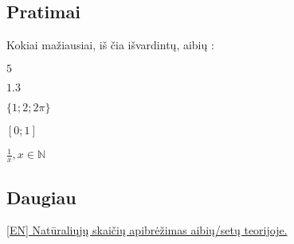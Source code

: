 \subsection{Pratimai}

Kokiai mažiausiai, iš čia išvardintų, aibių : \\
\begin{exercises}
    \item $5$
    \item $1.3$
    \item $\{1; 2; 2\pi\}$
    \item $\left[0; 1\right]$ 
    \item $\frac{1}{x}, x \in \mathbb{N}$ 
\end{exercises} 

\subsection{Daugiau}

\href {https://en.wikipedia.org/wiki/Set-theoretic_definition_of_natural_numbers}{[EN] Natūraliųjų skaičių apibrėžimas aibių/setų teorijoje.}

